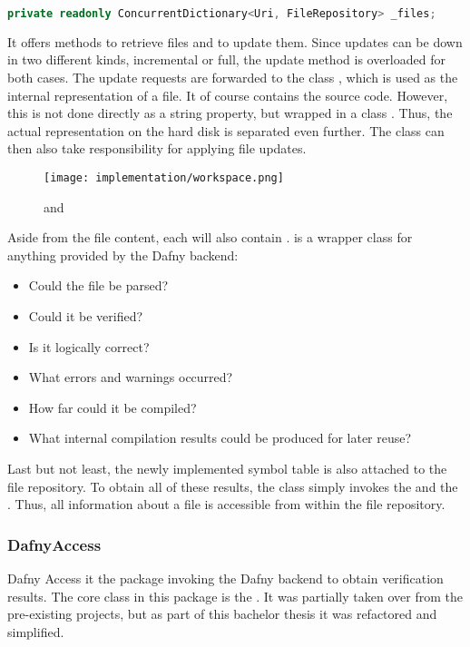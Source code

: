 \begin{lstlisting}[language=csharp, caption={Workspace Property}, captionpos=b, label={lst:workspaceproperty}]
private readonly ConcurrentDictionary<Uri, FileRepository> _files;
\end{lstlisting}

It offers methods to retrieve files and to update them.
Since updates can be down in two different kinds, incremental or full, the update method is overloaded for both cases.
The update requests are forwarded to the class , which is used as the internal representation of a file.
It of course contains the source code.
However, this is not done directly as a string property, but wrapped in a class .
Thus, the actual representation on the hard disk is separated even further.
The  class can then also take responsibility for applying file updates.\\

\begin{figure}[H]
    \centering
    \texttt{[image: implementation/workspace.png]}
    \caption{ and }
    \label{fig:worksapceAndRepo}
\end{figure}

Aside from the file content, each  will also contain .
 is a wrapper class for anything provided by the Dafny backend:
\begin{itemize}
    \item Could the file be parsed?
    \item Could it be verified?
    \item Is it logically correct?
    \item What errors and warnings occurred?
    \item How far could it be compiled?
    \item What internal compilation results could be produced for later reuse?
\end{itemize}

Last but not least, the newly implemented symbol table is also attached to the file repository.
To obtain all of these results, the class simply invokes the  and the .
Thus, all information about a file is accessible from within the file repository.

\subsubsection{DafnyAccess}
Dafny Access it the package invoking the Dafny backend to obtain verification results.
The core class in this package is the .
It was partially taken over from the pre-existing projects, but as part of this bachelor thesis it was refactored and simplified.\\

